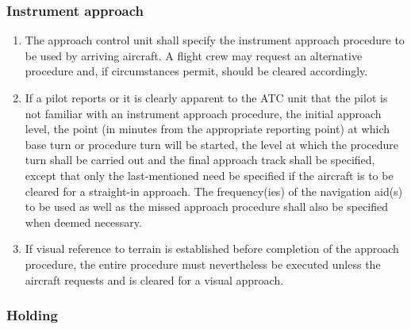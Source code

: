\subsubsection{Instrument approach}

\begin{enumerate}
    \item The approach control unit shall specify the instrument approach procedure to be used by arriving aircraft. A flight crew may request an alternative procedure and, if circumstances permit, should be cleared accordingly.
    \item If a pilot reports or it is clearly apparent to the ATC unit that the pilot is not familiar with an instrument approach procedure, the initial approach level, the point (in minutes from the appropriate reporting point) at which base turn or procedure turn will be started, the level at which the procedure turn shall be carried out and the final approach track shall be specified, except that only the last-mentioned need be specified if the aircraft is to be cleared for a straight-in approach. The frequency(ies) of the navigation aid(s) to be used as well as the missed approach procedure shall also be specified when deemed necessary.
    \item If visual reference to terrain is established before completion of the approach procedure, the entire procedure must nevertheless be executed unless the aircraft requests and is cleared for a visual approach.
\end{enumerate}

\subsubsection{Holding}

